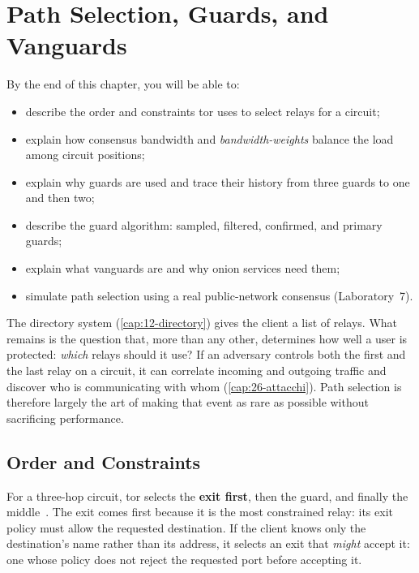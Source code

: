 \chapter{Path Selection, Guards, and Vanguards}\label{cap:13-percorso}

\begin{obiettivi}
By the end of this chapter, you will be able to:
\begin{itemize}[nosep]
  \item describe the order and constraints tor uses to select relays for a circuit;
  \item explain how consensus bandwidth and \emph{bandwidth-weights} balance the load among circuit positions;
  \item explain why guards are used and trace their history from three guards to one and then two;
  \item describe the guard algorithm: sampled, filtered, confirmed, and primary guards;
  \item explain what vanguards are and why onion services need them;
  \item simulate path selection using a real public-network consensus (Laboratory~7).
\end{itemize}
\end{obiettivi}

The directory system (\cref{cap:12-directory}) gives the client a list of relays. What remains is the question that, more than any other, determines how well a user is protected: \emph{which} relays should it use? If an adversary controls both the first and the last relay on a circuit, it can correlate incoming and outgoing traffic and discover who is communicating with whom (\cref{cap:26-attacchi}). Path selection is therefore largely the art of making that event as rare as possible without sacrificing performance.

\section{Order and Constraints}\label{sec:percorso-vincoli}

For a three-hop circuit, tor selects the \textbf{exit first}, then the guard, and finally the middle~. The exit comes first because it is the most constrained relay: its exit policy must allow the requested destination. If the client knows only the destination's name rather than its address, it selects an exit that \emph{might} accept it: one whose policy does not reject the requested port before accepting it.

